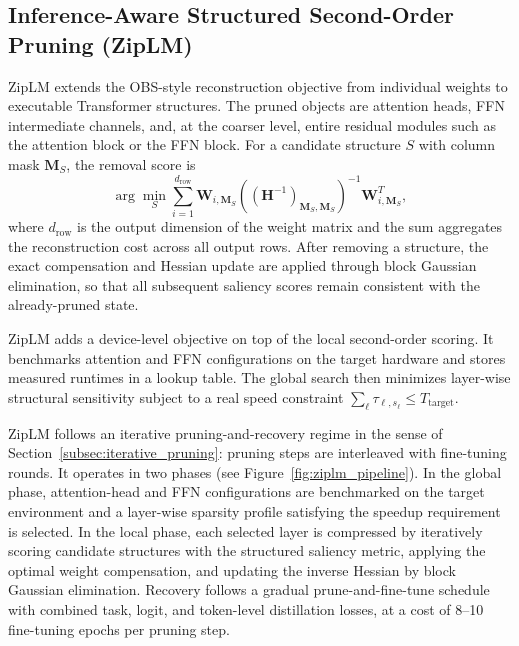\methodsep

\subsection{Inference-Aware Structured Second-Order Pruning (ZipLM)}

ZipLM\cite{kurtic2023ziplm} extends the OBS-style reconstruction objective from individual weights to executable Transformer structures. The pruned objects are attention heads, FFN intermediate channels, and, at the coarser level, entire residual modules such as the attention block or the FFN block. For a candidate structure $S$ with column mask $\mathbf{M}_S$, the removal score is
\begin{equation}
	\arg\min_S
	\sum_{i=1}^{d_{\text{row}}}
	\mathbf{W}_{i,\mathbf{M}_S}
	\left(\left(\mathbf{H}^{-1}\right)_{\mathbf{M}_S,\mathbf{M}_S}\right)^{-1}
	\mathbf{W}_{i,\mathbf{M}_S}^{T},
\end{equation}
where $d_{\text{row}}$ is the output dimension of the weight matrix and the sum aggregates the reconstruction cost across all output rows. After removing a structure, the exact compensation and Hessian update are applied through block Gaussian elimination, so that all subsequent saliency scores remain consistent with the already-pruned state.

ZipLM adds a device-level objective on top of the local second-order scoring. It benchmarks attention and FFN configurations on the target hardware and stores measured runtimes in a lookup table. The global search then minimizes layer-wise structural sensitivity subject to a real speed constraint $\sum_\ell \tau_{\ell,s_\ell} \leq T_{\text{target}}$.

ZipLM follows an iterative pruning-and-recovery regime in the sense of Section~\ref{subsec:iterative_pruning}: pruning steps are interleaved with fine-tuning rounds. It operates in two phases (see Figure~\ref{fig:ziplm_pipeline}). In the global phase, attention-head and FFN configurations are benchmarked on the target environment and a layer-wise sparsity profile satisfying the speedup requirement is selected. In the local phase, each selected layer is compressed by iteratively scoring candidate structures with the structured saliency metric, applying the optimal weight compensation, and updating the inverse Hessian by block Gaussian elimination. Recovery follows a gradual prune-and-fine-tune schedule with combined task, logit, and token-level distillation losses, at a cost of 8--10 fine-tuning epochs per pruning step.

